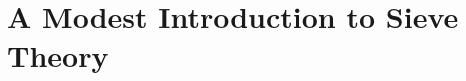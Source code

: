 \documentclass[elemannt.tex]{subfile}
\begin{document}
	\chapter[Sieve Theory]{A Modest Introduction to Sieve Theory}
\end{document}
